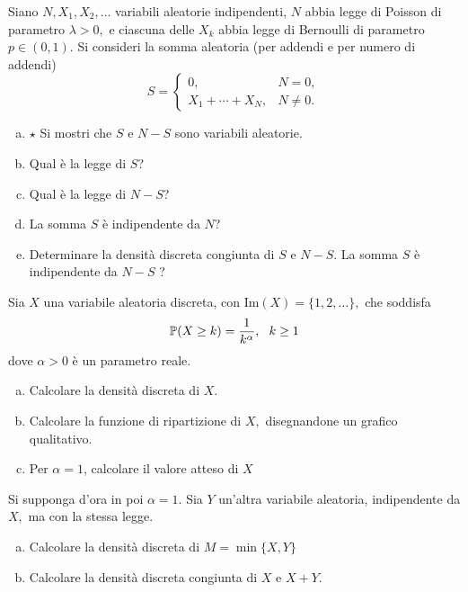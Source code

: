 \Esercizio{}

Siano $N,X_{1} ,X_{2} ,\dots $ variabili aleatorie indipendenti, $N$ abbia legge di Poisson di parametro $\lambda  >0,$ e ciascuna delle $X_{k}$ abbia legge di Bernoulli di parametro $p\in (0,1).$ Si consideri la somma aleatoria (per addendi e per numero di addendi)
\begin{equation*}
	S=
	\begin{cases}
		0, & N=0,\\
		X_{1} +\cdots +X_{N} , & N\neq 0.
	\end{cases}
\end{equation*}
\begin{enumerate}[a)]
	\item $\star$ Si mostri che $S$ e $N-S$ sono variabili aleatorie.
	\item Qual è la legge di $S$?
	\item Qual è la legge di $N-S$?
	\item La somma $S$ è indipendente da $N$?
	\item Determinare la densità discreta congiunta di $S$ e $N-S$. La somma $S$ è indipendente da $N-S$ ?
\end{enumerate}

\Esercizio{}

Sia $X$ una variabile aleatoria discreta, con $\mathrm{Im} (X)=\{1,2,\dots \},$ che soddisfa
\begin{equation*}
\mathbb{P} (X\geq k)=\frac{1}{k^{\alpha }} ,\ \ k\geq 1
\end{equation*}
dove $\alpha  >0$ è un parametro reale.
\begin{enumerate}[a)]
	\item Calcolare la densità discreta di $X$.
	\item Calcolare la funzione di ripartizione di $X,$ disegnandone un grafico qualitativo.
	\item Per $\alpha =1$, calcolare il valore atteso di $X$
\end{enumerate}
Si supponga d'ora in poi $\alpha =1.$ Sia $Y$ un'altra variabile aleatoria, indipendente da $X,$ ma con la stessa legge.
\begin{enumerate}[a),resume]
	\item Calcolare la densità discreta di $M=\min \{X,Y\}$
	\item Calcolare la densità discreta congiunta di $X$ e $X+Y$.
\end{enumerate}

\Esercizio{}

